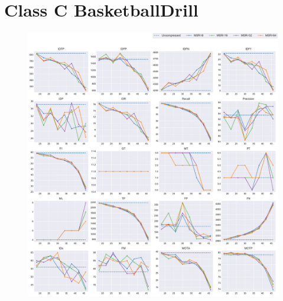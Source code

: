 
\section{Class C BasketballDrill}
\label{sec:appendix/BasketballDrill_all}


\begin{figure}[!htbp]
\centering
\includegraphics[width=1.0\linewidth]{img/appendix/BasketballDrill_all_multiplots_qp.pdf}
\caption[Result of all object classes in Class C BasketballDrill with Horizontal Axis of QP]{}
\label{fig:BasketballDrill_all_qp}
\end{figure}

